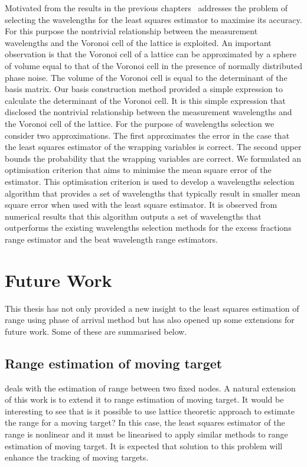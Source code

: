 Motivated from the results in the previous chapters~ addresses the problem of selecting the wavelengths for the least squares estimator to maximise its accuracy. For this purpose the nontrivial relationship between the measurement wavelengths and the Voronoi cell of the lattice is exploited.  An important observation is that the Voronoi cell of a lattice can be approximated by a sphere of volume equal to that of the Voronoi cell in the presence of normally distributed phase noise. The volume of the Voronoi cell is equal to the determinant of the basis matrix. Our basis construction method provided a simple expression to calculate the determinant of the Voronoi cell. It is this simple expression that disclosed the nontrivial relationship between the measurement wavelengths and the Voronoi cell of the lattice. For the purpose of wavelengths selection we consider two approximations. The first approximates the error in the case that the least squares estimator of the wrapping variables is correct. The second upper bounds the probability that the wrapping variables are correct. We formulated an optimisation criterion that aims to minimise the mean square error of the estimator. This optimisation criterion is used to develop a wavelengths selection algorithm that provides a set of wavelengths that typically result in smaller mean square error when used with the least square estimator. It is observed from numerical results that this algorithm outputs a set of wavelengths that outperforms the existing wavelengths selection methods for the excess fractions range estimator and the beat wavelength range estimators.

\section{Future Work}
This thesis has not only provided a new insight to the least squares estimation of range using phase of arrival method but has also opened up some extensions for future work. Some of these are summarised below.

\subsection*{Range estimation of moving target}
 deals with the estimation of range between two fixed nodes. A natural extension of this work is to extend it to range estimation of moving target. It would be interesting to see that is it possible to use lattice theoretic approach to estimate the range for a moving target? In this case, the least squares estimator of the range is nonlinear and it must be linearised to apply similar methods to range estimation of moving target. It is expected that solution to this problem will enhance the tracking of moving targets.

